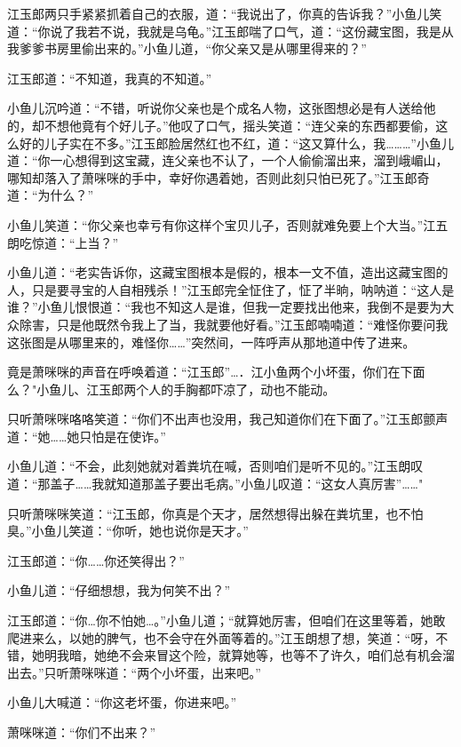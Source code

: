 \documentclass[12pt,oneside]{book}
\begin{document}
江玉郎两只手紧紧抓着自己的衣服，道：``我说出了，你真的告诉我？''小鱼儿笑道：``你说了我若不说，我就是乌龟。''江玉郎喘了口气，道：``这份藏宝图，我是从我爹爹书房里偷出来的。''小鱼儿道，``你父亲又是从哪里得来的？''

江玉郎道：``不知道，我真的不知道。''

小鱼儿沉吟道：``不错，听说你父亲也是个成名人物，这张图想必是有人送给他的，却不想他竟有个好儿子。''他叹了口气，摇头笑道：``连父亲的东西都要偷，这么好的儿子实在不多。''江玉郎脸居然红也不红，道：``这又算什么，我\ldots\ldots\ldots{}''小鱼儿道：``你一心想得到这宝藏，连父亲也不认了，一个人偷偷溜出来，溜到峨嵋山，哪知却落入了萧咪咪的手中，幸好你遇着她，否则此刻只怕已死了。''江玉郎奇道：``为什么？''

小鱼儿笑道：``你父亲也幸亏有你这样个宝贝儿子，否则就难免要上个大当。''江五朗吃惊道：``上当？''

小鱼儿道：``老实告诉你，这藏宝图根本是假的，根本一文不值，造出这藏宝图的人，只是要寻宝的人自相残杀！''江玉郎完全怔住了，怔了半晌，呐呐道：``这人是谁？''小鱼儿恨恨道：``我也不知这人是谁，但我一定要找出他来，我倒不是要为大众除害，只是他既然令我上了当，我就要他好看。''江玉郎喃喃道：``难怪你要问我这张图是从哪里来的，难怪你\ldots\ldots{}''突然间，一阵呼声从那地道中传了进来。

竟是萧咪咪的声音在呼唤着道：``江玉郎''\ldots．江小鱼两个小坏蛋，你们在下面么？"小鱼儿、江玉郎两个人的手胸都吓凉了，动也不能动。

只听萧咪咪咯咯笑道：``你们不出声也没用，我己知道你们在下面了。''江玉郎颤声道：``她\ldots\ldots 她只怕是在使诈。''

小鱼儿道：``不会，此刻她就对着粪坑在喊，否则咱们是听不见的。''江玉朗叹道：``那盖子\ldots\ldots 我就知道那盖子要出毛病。''小鱼儿叹道：``这女人真厉害''\ldots\ldots"

只听萧咪咪笑道：``江玉郎，你真是个天才，居然想得出躲在粪坑里，也不怕臭。''小鱼儿笑道：``你听，她也说你是天才。''

江玉郎道：``你\ldots\ldots 你还笑得出？''

小鱼儿道：``仔细想想，我为何笑不出？''

江玉郎道：``你\ldots 你不怕她\ldots。''小鱼儿道；``就算她厉害，但咱们在这里等着，她敢爬进来么，以她的脾气，也不会守在外面等着的。''江玉朗想了想，笑道：``呀，不错，她明我暗，她绝不会来冒这个险，就算她等，也等不了许久，咱们总有机会溜出去。''只听萧咪咪道：``两个小坏蛋，出来吧。''

小鱼儿大喊道：``你这老坏蛋，你进来吧。''

萧咪咪道：``你们不出来？''
\end{document}

